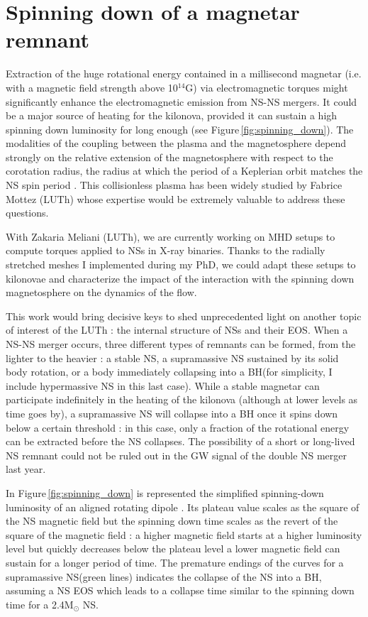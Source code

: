 \documentclass[12pt,onecolumn]{article}
\makeatletter
\newcommand{\gw}{GW\xspace}
\newcommand{\eos}{EOS\xspace}
\newcommand{\mhd}{MHD\xspace}
\newcommand*{\ns}{NS\@\xspace}
\newcommand*{\nss}{NSs\@\xspace}
\newcommand*{\bh}{BH\@\xspace}
\newcommand*{\eg}{e.g.\@\xspace}
\newcommand*{\ie}{i.e.\@\xspace}
\makeatother
\begin{document}
\section{Spinning down of a magnetar remnant}

Extraction of the huge rotational energy contained in a millisecond magnetar (\ie with a magnetic field strength above 10$^{14}$G) via electromagnetic torques might significantly enhance the electromagnetic emission from \ns-\ns mergers. It could be a major source of heating for the kilonova, provided it can sustain a high spinning down luminosity for long enough (see Figure\,\ref{fig:spinning_down}). The modalities of the coupling between the plasma and the magnetosphere depend strongly on the relative extension of the magnetosphere with respect to the corotation radius, the radius at which the period of a Keplerian orbit matches the \ns spin period \citep[see \eg the propeller effect described in][]{Bozzo2008}. This collisionless plasma has been widely studied by Fabrice Mottez (LUTh) whose expertise would be extremely valuable to address these questions. 

With Zakaria Meliani (LUTh), we are currently working on \mhd setups to compute torques applied to \nss in X-ray binaries. Thanks to the radially stretched meshes I implemented during my PhD, we could adapt these setups to kilonovae and characterize the impact of the interaction with the spinning down magnetosphere on the dynamics of the flow. 

This work would bring decisive keys to shed unprecedented light on another topic of interest of the LUTh : the internal structure of \nss and their \eos. When a \ns-\ns merger occurs, three different types of remnants can be formed, from the lighter to the heavier : a stable \ns, a supramassive \ns sustained by its solid body rotation, or a body immediately collapsing into a \bh (for simplicity, I include hypermassive \ns in this last case). While a stable magnetar can participate indefinitely in the heating of the kilonova (although at lower levels as time goes by), a supramassive \ns will collapse into a \bh once it spins down below a certain threshold : in this case, only a fraction of the rotational energy can be extracted before the \ns collapses. The possibility of a short or long-lived \ns remnant could not be ruled out in the \gw signal of the double \ns merger last year.

In Figure\,\ref{fig:spinning_down} is represented the simplified spinning-down luminosity of an aligned rotating dipole \citep{Spitkovsky2006,Philippov2014}. Its plateau value scales as the square of the \ns magnetic field but the spinning down time scales as the revert of the square of the magnetic field : a higher magnetic field starts at a higher luminosity level but quickly decreases below the plateau level a lower magnetic field can sustain for a longer period of time. The premature endings of the curves for a supramassive \ns (green lines) indicates the collapse of the \ns into a \bh, assuming a \ns \eos which leads to a collapse time similar to the spinning down time for a 2.4M$_{\odot}$ \ns \citep[based on][]{Metzger2015}.
\end{document}
